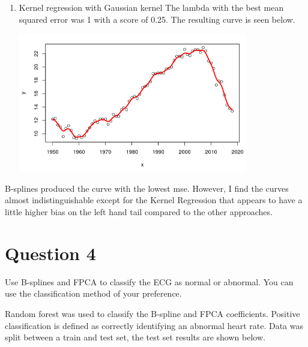 \documentclass[12pt,letterpaper]{article}
\begin{document}
\begin{enumerate}[label=\alph*)]
\item  Kernel regression with Gaussian kernel
The lambda with the best mean squared error was 1 with a score of 0.25.  The resulting curve is seen below.



\begin{center}
\includegraphics[width=10cm]{kregress.png} 
\end{center}

\end{enumerate}

B-splines produced the curve with the lowest mse.  However, I find the curves almost indistinguishable except for the Kernel Regression that appears to have a little higher bias on the left hand tail compared to the other approaches.



 
\section*{Question 4}

Use B-splines and FPCA to classify the ECG as normal or abnormal. You can use the classification method of your preference.


Random forest was used to classify the B-spline and FPCA coefficients.  Positive classification is defined as correctly identifying an abnormal heart rate.  Data was split between a train and test set, the test set results are shown below.
\end{document}
